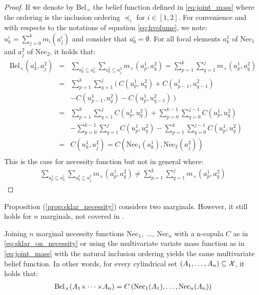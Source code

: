 \begin{proof}
    If we denote by $\mathrm{Bel}_\times$ the belief function defined in \eqref{eq:joint_mass} where the ordering is the inclusion ordering $\preceq_i$ for $i\in[1,2]$. For convenience and with respects to the notations of equation \eqref{eq:hvolume}, we note: $u^i_k=\sum_{j=0}^{k}m_i(a_j^i)$ and consider that $a^i_0=\emptyset$.
    For all focal elements $a_k^1$ of $\mathrm{Nec}_1$ and $a^2_j$ of $\mathrm{Nec}_2$, it holds that:
    \begin{eqnarray*}
        \mathrm{Bel}_\times(a^1_k, a^2_j) &=& \sum_{a^1_p\subseteq a_k^1}\sum_{a^2_q\subseteq a_j^2}m_\times(a^1_p, a^2_q) = \sum_{p=1}^k\sum_{q=1}^j m_\times(a^1_p, a^2_q)\\
        &=&\sum_{p=1}^k\sum_{q=1}^j (~C(u^1_p, u^2_q) + C(u^1_{p-1}, u^2_{q-1}) \\
        &&- C(u^1_{p-1}, u^2_{q}) - C(u^1_{p}, u^2_{q-1})~)\\
        &=&\sum_{p=1}^k\sum_{q=1}^jC(u^1_p, u^2_q) + \sum_{p=0}^{k-1}\sum_{q=0}^{j-1}C(u^1_p, u^2_q) \\
        &&- \sum_{p=0}^{k-1}\sum_{q=1}^jC(u^1_p, u^2_q) - \sum_{p=1}^k\sum_{q=0}^{j-1}C(u^1_p, u^2_q)\\
        &=& C(u^1_k, u^2_j) = C\left(\mathrm{Nec}_1(a_k^1), \mathrm{Nec}_2(a_j^2)\right)\\
    \end{eqnarray*}
    This is the case for necessity function but not in general where:
    \begin{align*}
        \sum_{a^1_p\subseteq a_k^1}\sum_{a^2_q\subseteq a_j^2}m_\times(a^1_p, a^2_q) \neq \sum_{p=1}^k\sum_{q=1}^j m_\times(a^1_p, a^2_q)
    \end{align*}
\end{proof}

Proposition (\ref{prop:sklar_necessity}) considers two marginals. However, it still holds for $n$ marginals, not covered in \cite{schmelzer_sklars_2015}.
\begin{proposition}
   Joining $n$ marginal necessity functions $\mathrm{Nec}_1,~\dots,~\mathrm{Nec}_n$ with a n-copula $C$ as in \eqref{eq:sklar_on_necessity} or using the multivariate variate mass function as in \eqref{eq:joint_mass} with the natural inclusion ordering yields the same multivariate belief function. In other words, for every cylindrical set $(A_1, \dots, A_n)\subseteq{\mathcal{X}}$, it holds that:
\begin{eqnarray}
    \mathrm{Bel}_\times(A_1{\times\dots\times} A_n) = C\left(\mathrm{Nec}_1(A_1), \dots, \mathrm{Nec}_n(A_n)\right)
\end{eqnarray}
\end{proposition}

